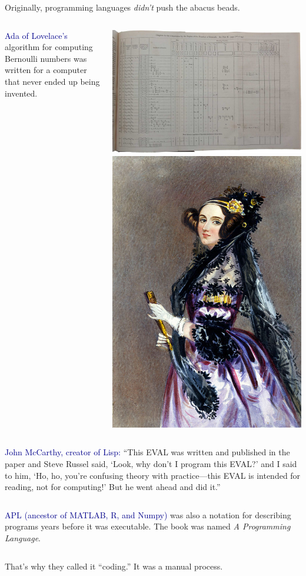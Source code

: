 \documentclass[aspectratio=169]{beamer}
\begin{document}
\begin{frame}{Originally, programming languages {\it didn't} push the abacus beads.}
\vspace{0.25 cm}
\begin{columns}
\textcolor{darkblue}{Ada of Lovelace's} algorithm for computing Bernoulli numbers was written for a computer that never ended up being invented.

\hfill\mbox{\hspace{-1 cm}\includegraphics[height=3 cm]{ada-program.jpg}\hspace{0.5 cm}\includegraphics[height=3 cm]{ada.jpg}}
\end{columns}

\vspace{0.5 cm}
\begin{columns}
\textcolor{darkblue}{John McCarthy, creator of Lisp:} ``This EVAL was written and published in the paper and Steve Russel said, `Look, why don't I program this EVAL?' and I said to him, `Ho, ho, you're confusing theory with practice---this EVAL is intended for reading, not for computing!' But he went ahead and did it.''
\end{columns}

\vspace{0.5 cm}
\begin{columns}
\textcolor{darkblue}{APL (ancestor of MATLAB, R, and Numpy)} was also a notation for describing programs years before it was executable. The book was named {\it A Programming Language}.
\end{columns}
\end{frame}

\begin{frame}{}
\Large
\vspace{1.25 cm}
\begin{center}
That's why they called it ``coding.'' It was a manual process.

\vspace{1.5 cm}
\end{center}
\end{frame}
\end{document}

